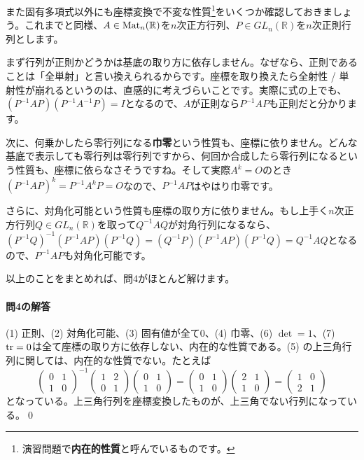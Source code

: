 また固有多項式以外にも座標変換で不変な性質\footnote{演習問題で\textbf{内在的性質}と呼んでいるものです。}をいくつか確認しておきましょう。これまでと同様、$A \in \operatorname{Mat}_n(\mathbb{R})$を$n$次正方行列、$P \in GL_n(\mathbb{R})$を$n$次正則行列とします。

まず行列が正則かどうかは基底の取り方に依存しません。なぜなら、正則であることは「全単射」と言い換えられるからです。座標を取り換えたら全射性 / 単射性が崩れるというのは、直感的に考えづらいことです。実際に式の上でも、$(P^{-1} A P)(P^{-1} A^{-1} P) = I$となるので、$A$が正則なら$P^{-1} A P$も正則だと分かります。

次に、何乗かしたら零行列になる\textbf{巾零}という性質も、座標に依りません。どんな基底で表示しても零行列は零行列ですから、何回か合成したら零行列になるという性質も、座標に依らなさそうですね。そして実際$A^k = O$のとき$(P^{-1} A P)^k = P^{-1} A^k P = O$なので、$P^{-1} A P$はやはり巾零です。

さらに、対角化可能という性質も座標の取り方に依りません。もし上手く$n$次正方行列$Q \in GL_n(\mathbb{R})$を取って$Q^{-1} A Q$が対角行列になるなら、$(P^{-1} Q)^{-1} (P^{-1} A P) (P^{-1} Q) = (Q^{-1} P) (P^{-1} A P) (P^{-1} Q) = Q^{-1} A Q$となるので、$P^{-1} A P$も対角化可能です。

以上のことをまとめれば、問4がほとんど解けます。

\paragraph{問4の解答}
(1) 正則、(2) 対角化可能、(3) 固有値が全て$0$、(4) 巾零、(6) $\det = 1$、(7) $\operatorname{tr} = 0$は全て座標の取り方に依存しない、内在的な性質である。(5) の上三角行列に関しては、内在的な性質でない。たとえば
\[
\begin{pmatrix}
0 & 1 \\
1 & 0
\end{pmatrix}^{-1}
\begin{pmatrix}
1 & 2 \\
0 & 1
\end{pmatrix}
\begin{pmatrix}
0 & 1 \\
1 & 0
\end{pmatrix}
=
\begin{pmatrix}
0 & 1 \\
1 & 0
\end{pmatrix}
\begin{pmatrix}
2 & 1 \\
1 & 0
\end{pmatrix}
=
\begin{pmatrix}
1 & 0 \\
2 & 1
\end{pmatrix}
\]
となっている。上三角行列を座標変換したものが、上三角でない行列になっている。\qed

